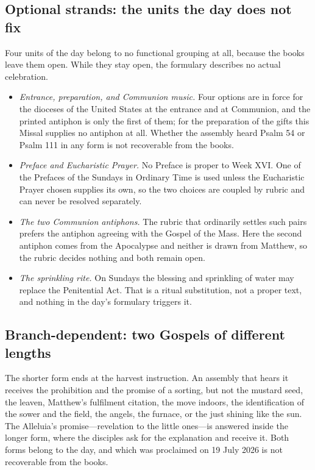 \subsection*{Optional strands: the units the day does not fix}

Four units of the day belong to no functional grouping at all, because the
books leave them open. While they stay open, the formulary describes no
actual celebration.

\begin{itemize}
\item \emph{Entrance, preparation, and Communion music.} Four options are in
force for the dioceses of the United States at the entrance and at Communion,
and the printed antiphon is only the first of them; for the preparation of the
gifts this Missal supplies no antiphon at all. Whether the assembly heard
Psalm 54 or Psalm 111 in any form is not recoverable from the books.
\item \emph{Preface and Eucharistic Prayer.} No Preface is proper to Week XVI.
One of the Prefaces of the Sundays in Ordinary Time is used unless the
Eucharistic Prayer chosen supplies its own, so the two choices are coupled by
rubric and can never be resolved separately.
\item \emph{The two Communion antiphons.} The rubric that ordinarily settles
such pairs prefers the antiphon agreeing with the Gospel of the Mass. Here the
second antiphon comes from the Apocalypse and neither is drawn from Matthew,
so the rubric decides nothing and both remain open.
\item \emph{The sprinkling rite.} On Sundays the blessing and sprinkling of
water may replace the Penitential Act. That is a ritual substitution, not a
proper text, and nothing in the day's formulary triggers it.
\end{itemize}

\subsection*{Branch-dependent: two Gospels of different lengths}

The shorter form ends at the harvest instruction. An assembly that hears it
receives the prohibition and the promise of a sorting, but not the mustard
seed, the leaven, Matthew's fulfilment citation, the move indoors, the
identification of the sower and the field, the angels, the furnace, or the
just shining like the sun. The Alleluia's promise---revelation to the little
ones---is answered inside the longer form, where the disciples ask for the
explanation and receive it. Both forms belong to the day, and which was
proclaimed on 19 July 2026 is not recoverable from the books.
